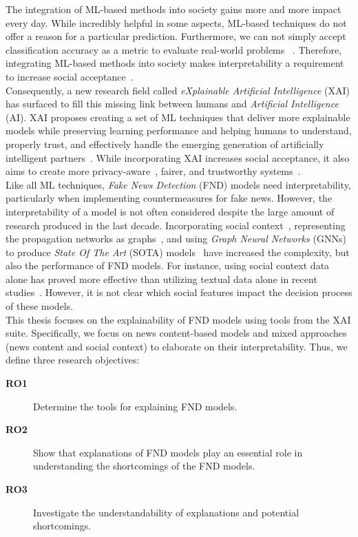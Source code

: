 The integration of ML-based methods into society gains more and more impact every day. While incredibly helpful in some aspects, ML-based techniques do not offer a reason for a particular prediction. Furthermore, we can not simply accept classification accuracy as a metric to evaluate real-world problems ~\parencite{TowardsARigorousScienceML_Velez}. Therefore, integrating ML-based methods into society makes interpretability a requirement to increase social acceptance~\parencite{InterpretableMachineLearning_Molnar}.\\
Consequently, a new research field called \emph{eXplainable Artificial Intelligence} (XAI) has surfaced to fill this missing link between humans and \emph{Artificial Intelligence} (AI). XAI proposes creating a set of ML techniques that deliver more explainable models while preserving learning performance and helping humans to understand, properly trust, and effectively handle the emerging generation of artificially intelligent partners~\parencite{XAI_Gunning}. While incorporating XAI increases social acceptance, it also aims to create more privacy-aware~\parencite{SlaveToTheAlgorithm_EdwardsVeale}, fairer, and trustworthy systems~\parencite{TheMythosOfModelInterpretability_Lipton}.\\
Like all ML techniques, \emph{Fake News Detection} (FND) models need interpretability, particularly when implementing countermeasures for fake news. However, the interpretability of a model is not often considered despite the large amount of research produced in the last decade. Incorporating social context~\parencite{FakeNewsNet_Shu}, representing the propagation networks as graphs~\parencite{UPFD_Dataset_Shu}, and using \emph{Graph Neural Networks} (GNNs) to produce \emph{State Of The Art} (SOTA) models~\parencite{FakeNewsDetectionUsingGeometricDeepLearning_Monti} have increased the complexity, but also the performance of FND models. For instance, using social context data alone has proved more effective than utilizing textual data alone in recent studies~\parencite{UPFD_Dataset_Shu}. However, it is not clear which social features impact the decision process of these models.\\
This thesis focuses on the explainability of FND models using tools from the XAI suite. Specifically, we focus on news content-based models and mixed approaches (news content and social context) to elaborate on their interpretability. Thus, we define three research objectives:
\begin{description}
    \item[\textbf{RO1}] Determine the tools for explaining FND models.
    \item[\textbf{RO2}] Show that explanations of FND models play an essential role in understanding the shortcomings of the FND models.
    \item[\textbf{RO3}] Investigate the understandability of explanations and potential shortcomings.
\end{description}
